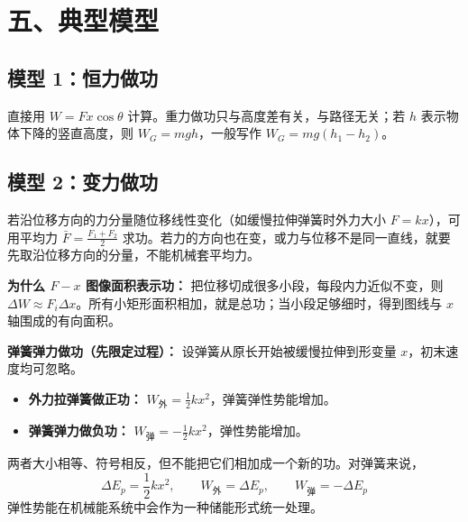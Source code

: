 \section*{五、典型模型}

\subsection*{模型 1：恒力做功}

直接用 $W = Fx\cos\theta$ 计算。重力做功只与高度差有关，与路径无关；若 $h$ 表示物体下降的竖直高度，则 $W_G = mgh$，一般写作 $W_G=mg(h_1-h_2)$。

\subsection*{模型 2：变力做功}

若沿位移方向的力分量随位移线性变化（如缓慢拉伸弹簧时外力大小 $F = kx$），可用平均力 $\bar{F} = \frac{F_1+F_2}{2}$ 求功。若力的方向也在变，或力与位移不是同一直线，就要先取沿位移方向的分量，不能机械套平均力。

\textbf{为什么 $F-x$ 图像面积表示功：} 把位移切成很多小段，每段内力近似不变，则 $\Delta W \approx F_i \Delta x$。所有小矩形面积相加，就是总功；当小段足够细时，得到图线与 $x$ 轴围成的有向面积。

\begin{center}
\begin{minipage}{0.94\linewidth}
\centering


\label{fig:work-area-micro}
\end{minipage}
\end{center}

\begin{samepage}
\textbf{弹簧弹力做功（先限定过程）：}
设弹簧从原长开始被缓慢拉伸到形变量 $x$，初末速度均可忽略。
\begin{itemize}
  \item \textbf{外力拉弹簧做正功：} $W_{\text{外}} = \frac12 kx^2$，弹簧弹性势能增加。
  \item \textbf{弹簧弹力做负功：} $W_{\text{弹}} = -\frac12 kx^2$，弹性势能增加。
\end{itemize}
两者大小相等、符号相反，但不能把它们相加成一个新的功。对弹簧来说，
\[
\Delta E_p = \frac12 kx^2,\qquad
W_{\text{外}}=\Delta E_p,\qquad
W_{\text{弹}}=-\Delta E_p
\]
弹性势能在机械能系统中会作为一种储能形式统一处理。
\end{samepage}

